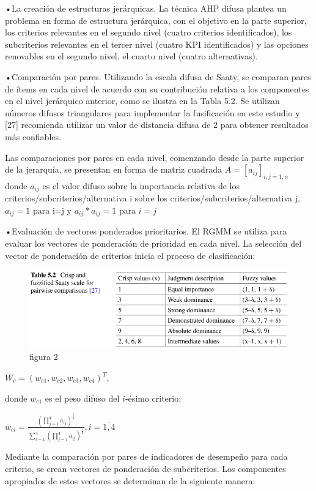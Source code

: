 \documentclass[
]{article}
\begin{document}
•La creación de estructuras jerárquicas. La técnica AHP difusa plantea
un problema en forma de estructura jerárquica, con el objetivo en la
parte superior, los criterios relevantes en el segundo nivel (cuatro
criterios identificados), los subcriterios relevantes en el tercer nivel
(cuatro KPI identificados) y las opciones renovables en el segundo
nivel. el cuarto nivel (cuatro alternativas).

•Comparación por pares. Utilizando la escala difusa de Saaty, se
comparan pares de ítems en cada nivel de acuerdo con su contribución
relativa a los componentes en el nivel jerárquico anterior, como se
ilustra en la Tabla 5.2. Se utilizan números difusos triangulares para
implementar la fusificación en este estudio y {[}27{]} recomienda
utilizar un valor de distancia difusa de 2 para obtener resultados más
confiables.

Las comparaciones por pares en cada nivel, comenzando desde la parte
superior de la jerarquía, se presentan en forma de matriz cuadrada
\(A=[a_{ij}]_{i,j=1,n}\) donde \(a_{ij}\) es el valor difuso sobre la
importancia relativa de los criterios/subcriterios/alternativa i sobre
los criterios/subcriterios/alternativa j, \(a_{ij}=1\) para i=j y
\(a_{ij}*a_{ij}=1\) para \(i=j\)

•Evaluación de vectores ponderados prioritarios. El RGMM se utiliza para
evaluar los vectores de ponderación de prioridad en cada nivel. La
selección del vector de ponderación de criterios inicia el proceso de
clasificación:

\begin{figure}
\centering
\includegraphics{fotos/tabla 5.2.png}
\caption{figura 2}
\end{figure}

\(W_c=(w_{c1},w_{c2},w_{c3},w_{c4})^T\),

donde \(w_{c1}\) es el peso difuso del \(i\)-ésimo criterio:

\(w_{ci}=\frac{(\prod_{j=1}^{4}a_{ij})^{\frac{1}{4}}}{\sum_{i=1}^{4}(\prod_{j=1}^{4}a_{ij})^{\frac{1}{4}}}, i=\overline{1,4}\)

Mediante la comparación por pares de indicadores de desempeño para cada
criterio, se crean vectores de ponderación de subcriterios. Los
componentes apropiados de estos vectores se determinan de la siguiente
manera:
\end{document}
